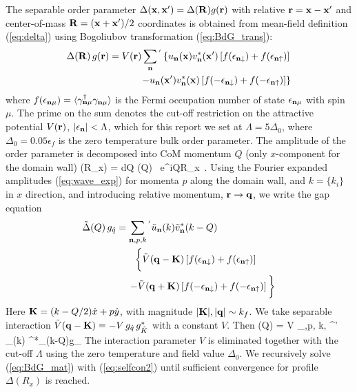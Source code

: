 \documentclass[prb,aps,showpacs,amsmath,twocolumn,10pt]{revtex4-1}
\begin{document}
The separable order parameter $\Delta({\bf x},{\bf x}')=\Delta({\bf R}) g({\bf r})$ 
with relative ${\bf r}={\bf x}-{\bf x}'$ and center-of-mass ${\bf R}=({\bf x}+{\bf x}')/2$ coordinates 
is obtained from mean-field definition (\ref{eq:delta}) using Bogoliubov transformation (\ref{eq:BdG_trans}):
\begin{align}
\begin{split}
\Delta({\bf R}) \, g({\bf r}) = V({\bf r}) \sum\limits_{{\bf n}}{}^{'}\left\{ 
u_{{\bf n}}({\bf x}) v^*_{{\bf n}}({\bf x}') \left[ f(\epsilon_{{\bf n}\downarrow}) + f(\epsilon_{{\bf n}\uparrow}) \right] \right.
\\
\left.
- u_{{\bf n}}({\bf x}') v^*_{{\bf n}}({\bf x}) \left[ f(-\epsilon_{{\bf n}\downarrow}) + f(-\epsilon_{{\bf n}\uparrow}) \right]
\right\}
\end{split}
\label{eq:selfcon0}
\end{align}
where $f(\epsilon_{{\bf n}\mu}) = \langle \gamma^\dagger_{{\bf n}\mu}\gamma_{{\bf n}\mu}
\rangle$ is the Fermi occupation number of state $\epsilon_{{\bf n}\mu}$ with spin $\mu$. 
The prime on the sum denotes the cut-off restriction on the attractive potential $V({\bf r})$, 
$|\epsilon_{{\bf n}}|<\Lambda$,\cite{PhysRevLett.80.4763} 
which for this report we set at $\Lambda = 5\Delta_0$, 
where $\Delta_0 = 0.05\epsilon_f$ is the zero temperature bulk order parameter. 
The amplitude of the order parameter is decomposed into CoM momentum $Q$ (only $x$-component for the domain wall) 
\be
\Delta(R_x) = \int dQ \;  \tilde{\Delta}(Q) \, e^{iQR_x} \,.
\ee
Using the Fourier expanded amplitudes (\ref{eq:wave_exp}) for momenta $p$ along the domain wall, 
and $k=\{k_i\}$ in $x$ direction, and introducing relative momentum, 
${\bf r} \to {\bf q}$, we write the gap equation 
\begin{align}
\begin{split}
\tilde{\Delta}(Q)\, g_{\hat{q}} = \sum\limits_{{\bf n},p, k}{}^{'} \tilde{u}_{{\bf n}}(k) \tilde{v}^*_{{\bf n}}(k-Q) 
\qquad\qquad\qquad
\\  
\bigg\{ \tilde{V}({\bf q}-{\bf K}) \left[f(\epsilon_{{\bf n}\downarrow}) + f(\epsilon_{{\bf n}\uparrow})\right] 
\qquad
\\
-\tilde{V}({\bf q}+{\bf K})\left[f(-\epsilon_{{\bf n}\downarrow}) + f(-\epsilon_{{\bf n}\uparrow})\right] \bigg\}
\end{split}
\label{eq:selfcon1}
\end{align}
Here ${\bf K} = (k-Q/2)\hat{x} + p\hat{y}$, with magnitude $|{\bf K}|,|{\bf q}|\sim k_f$. We take separable 
interaction $\tilde{V}({\bf q}-{\bf K}) = - V \, g_{\hat{q}} \, g^*_{\hat{K}}$ with a constant $V$. 
Then 
\be
\tilde{\Delta}(Q) = V \sum\limits_{\vn,p, k, \mu}{}^{'} 
_{\vn}(k) ^*_{\vn}(k-Q)g_{} \tanh {} 
\label{eq:selfcon2}
\ee
The interaction parameter $V$ is eliminated together with the cut-off $\Lambda$ 
using the zero temperature and field value $\Delta_0$. 
We recursively solve (\ref{eq:BdG_mat}) with 
(\ref{eq:selfcon2}) until sufficient convergence for profile  $\Delta(R_x)$ is reached. 


\end{document}
